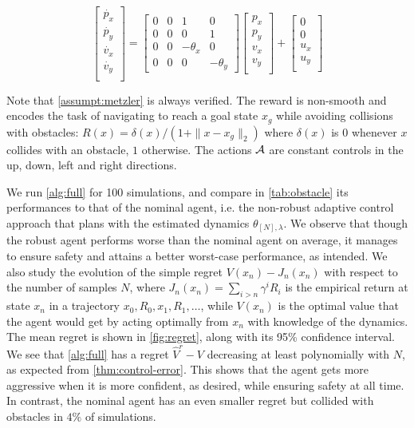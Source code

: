 \documentclass{article}
\begin{document}
\begin{equation*}
\begin{bmatrix}
\dot{p_x}\\
\dot{p_y}\\
\dot{v_x}\\
\dot{v_y}\\
\end{bmatrix} = 
\begin{bmatrix}
0 & 0 & 1 & 0 \\
0 & 0 & 0 & 1 \\
0 & 0 & -\theta_x & 0 \\
0 & 0 & 0 & -\theta_y
\end{bmatrix}
\begin{bmatrix}
{p_x}\\
{p_y}\\
{v_x}\\
{v_y}\\
\end{bmatrix}
+
\begin{bmatrix}
0\\
0\\
{u_x}\\
{u_y}\\
\end{bmatrix}
\end{equation*}

Note that \autoref{assumpt:metzler} is always verified. The reward is non-smooth and encodes the task of navigating to reach a goal state $x_g$ while avoiding collisions with obstacles: $R(x) = \delta(x)/(1 + \|x - x_g\|_2)$  where $\delta(x)$ is $0$ whenever $x$ collides with an obstacle, $1$ otherwise. The actions $\mathcal{A}$ are constant controls in the up, down, left and right directions.

We run \autoref{alg:full} for 100 simulations, and compare in \autoref{tab:obstacle} its performances to that of the nominal agent, i.e. the non-robust adaptive control approach that plans with the estimated dynamics $\theta_{[N],\lambda}$. We observe that though the robust agent performs worse than the nominal agent on average, it manages to ensure safety and attains a better worst-case performance, as intended. We also study the evolution of the simple regret $V(x_n) - J_n(x_n)$ with respect to the number of samples $N$, where $J_n(x_n) = \sum_{i > n} \gamma^i R_i$ is the empirical return at state $x_n$ in a trajectory $x_0, R_0, x_1, R_1, \dots$, while $V(x_n)$ is the optimal value that the agent would get by acting optimally from $x_n$ with knowledge of the dynamics. The mean regret is shown in \autoref{fig:regret}, along with its 95\% confidence interval. We see that \autoref{alg:full} has a regret $\hat{V}^r - V$ decreasing at least polynomially with $N$, as expected from \autoref{thm:control-error}. This shows that the agent gets more aggressive when it is more confident, as desired, while ensuring safety at all time. In contrast, the nominal agent has an even smaller regret but collided with obstacles in $4\%$ of simulations.
\end{document}
